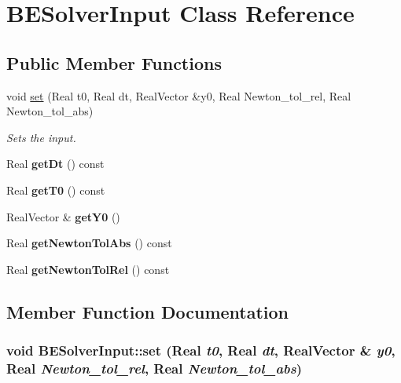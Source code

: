 \hypertarget{classBESolverInput}{
\section{BESolverInput Class Reference}
\label{classBESolverInput}
}
\subsection*{Public Member Functions}
\begin{DoxyCompactItemize}
\item 
void \hyperlink{classBESolverInput_ae169118cebc5cab39af09d11eea4aff1}{set} (Real t0, Real dt, RealVector \&y0, Real Newton\_\-tol\_\-rel, Real Newton\_\-tol\_\-abs)
\begin{DoxyCompactList}\small\item\em Sets the input. \item\end{DoxyCompactList}\item 
\hypertarget{classBESolverInput_af7564a03a9212a553fc7308daf91dcfc}{
Real {\bfseries getDt} () const }
\label{classBESolverInput_af7564a03a9212a553fc7308daf91dcfc}

\item 
\hypertarget{classBESolverInput_a058be78d49b73876d0d09a5298c10fbb}{
Real {\bfseries getT0} () const }
\label{classBESolverInput_a058be78d49b73876d0d09a5298c10fbb}

\item 
\hypertarget{classBESolverInput_aae6968751afbbaae823b1f2f35d77ad2}{
RealVector \& {\bfseries getY0} ()}
\label{classBESolverInput_aae6968751afbbaae823b1f2f35d77ad2}

\item 
\hypertarget{classBESolverInput_ab3e74a57ff02d7bd7fe1082cf5d74f09}{
Real {\bfseries getNewtonTolAbs} () const }
\label{classBESolverInput_ab3e74a57ff02d7bd7fe1082cf5d74f09}

\item 
\hypertarget{classBESolverInput_a02df3d117faf378369713a9f9e2aeb60}{
Real {\bfseries getNewtonTolRel} () const }
\label{classBESolverInput_a02df3d117faf378369713a9f9e2aeb60}

\end{DoxyCompactItemize}


\subsection{Member Function Documentation}
\hypertarget{classBESolverInput_ae169118cebc5cab39af09d11eea4aff1}{
\subsubsection[{set}]{\setlength{\rightskip}{0pt plus 5cm}void BESolverInput::set (Real {\em t0}, \/  Real {\em dt}, \/  RealVector \& {\em y0}, \/  Real {\em Newton\_\-tol\_\-rel}, \/  Real {\em Newton\_\-tol\_\-abs})}}
\label{classBESolverInput_ae169118cebc5cab39af09d11eea4aff1}


